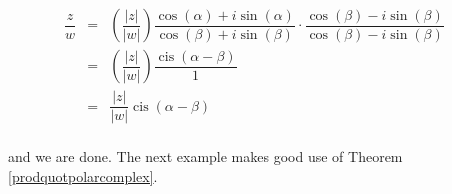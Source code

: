 \[ \begin{array}{rcll}

\dfrac{z}{w} & = & \left( \dfrac{|z|}{|w|}\right) \dfrac{\cos(\alpha) + i \sin(\alpha)}{\cos(\beta) + i \sin(\beta)} \cdot \dfrac{\cos(\beta) - i \sin(\beta)}{\cos(\beta) - i \sin(\beta)} & \\[8pt]
						 & = & \left( \dfrac{|z|}{|w|}\right) \dfrac{\operatorname{cis}(\alpha - \beta)}{1}  &  \\ 	[8pt]	 
						 & = &  \dfrac{|z|}{|w|} \operatorname{cis}(\alpha - \beta) \\ \end{array}\]

and we are done.  The next example makes good use of Theorem \ref{prodquotpolarcomplex}.

\medskip

